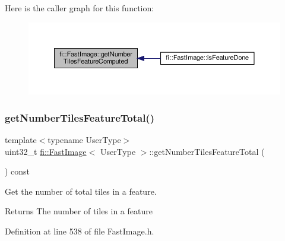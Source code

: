 Here is the caller graph for this function\+:
\nopagebreak
\begin{figure}[H]
\begin{center}
\leavevmode
\includegraphics[width=350pt]{dc/d6b/classfi_1_1FastImage_adc03852a5c3ecabab795cd13034c3d9e_icgraph}
\end{center}
\end{figure}
\mbox{\label{classfi_1_1FastImage_a37f70f57589775492c72a43b23ab0872}} 
\subsubsection{\texorpdfstring{get\+Number\+Tiles\+Feature\+Total()}{getNumberTilesFeatureTotal()}}
{\footnotesize\ttfamily template$<$typename User\+Type$>$ \\
uint32\+\_\+t \hyperlink{classfi_1_1FastImage}{fi\+::\+Fast\+Image}$<$ User\+Type $>$\+::get\+Number\+Tiles\+Feature\+Total (\begin{DoxyParamCaption}{ }\end{DoxyParamCaption}) const\hspace{0.3cm}{\ttfamily [inline]}}



Get the number of total tiles in a feature. 

\begin{DoxyReturn}{Returns}
The number of tiles in a feature 
\end{DoxyReturn}


Definition at line 538 of file Fast\+Image.\+h.

